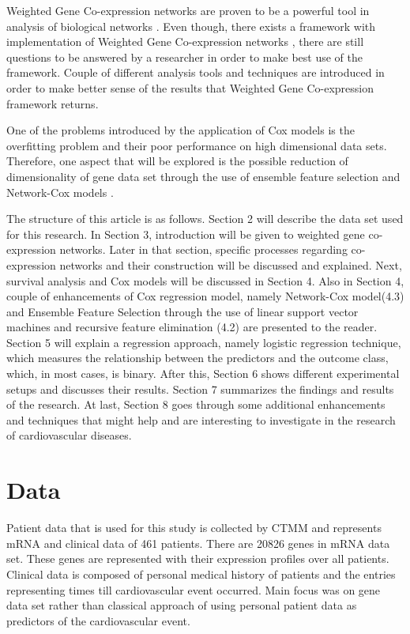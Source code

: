 \documentclass{ba-kecs}
\numberwithin{figure}{section}
\numberwithin{equation}{section}
\begin{document}
Weighted Gene Co-expression networks are proven to be a powerful tool in analysis of biological networks \cite{wgcna2}. Even though, there exists a framework with implementation of Weighted Gene Co-expression networks \cite{wgcna3}, there are still questions to be answered by a researcher in order to make best use of the framework. Couple of different analysis tools and techniques are introduced in order to make better sense of the results that Weighted Gene Co-expression framework returns.

One of the problems introduced by the application of Cox models is the overfitting problem and their poor performance on high dimensional data sets. Therefore, one aspect that will be explored is the possible reduction of dimensionality of gene data set through the use of ensemble feature selection and Network-Cox models \cite{bootstrap,netcox}.

The structure of this article is as follows. Section 2 will describe the data set used for this research. In Section 3, introduction will be given to weighted gene co-expression networks. Later in that section, specific processes regarding co-expression networks and their construction will be discussed and explained. Next, survival analysis and Cox models will be discussed in Section 4. Also in Section 4, couple of enhancements of Cox regression model, namely Network-Cox model(4.3) and Ensemble Feature Selection through the use of linear support vector machines and recursive feature elimination (4.2) are presented to the reader. Section 5 will explain a regression approach, namely logistic regression technique, which measures the relationship between the predictors and the outcome class, which, in most cases, is binary.  After this, Section 6 shows different experimental setups and discusses their results. Section 7 summarizes the findings and results of the research. At last, Section 8 goes through some additional enhancements and techniques that might help and are interesting to investigate in the research of cardiovascular diseases.

\section{Data}
Patient data that is used for this study is collected by CTMM and represents mRNA and clinical data of 461 patients. There are 20826 genes in mRNA data set. These genes are represented with their expression profiles over all patients. Clinical data is composed of personal medical history of patients and the entries representing times till cardiovascular event occurred. Main focus was on gene data set rather than classical approach of using personal patient data as predictors of the cardiovascular event.
\end{document}
